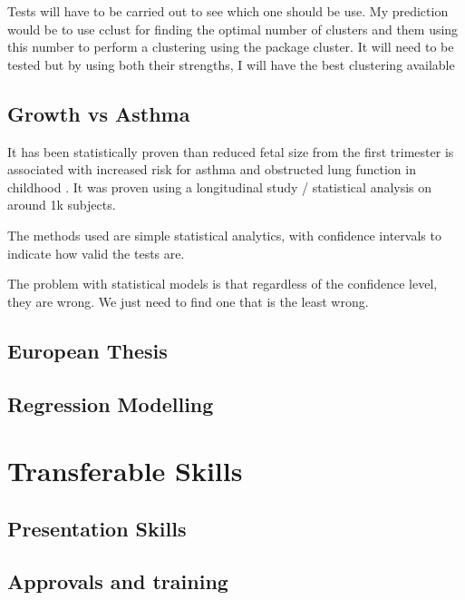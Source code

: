 \documentclass[bsc]{abdnthesis}
\begin{document}
Tests will have to be carried out to see which one should be use. My prediction would be to use cclust for finding the optimal number of clusters and them using this number to perform a clustering using the package cluster. It will need to be tested but by using both their strengths, I will have the best clustering available
\section{Growth vs Asthma} %
\label{sec:growth_vs_asthma}
It has been statistically proven than reduced fetal size from the first trimester is associated with increased risk for asthma and obstructed lung function in childhood \cite{ turner1}. It was proven using a longitudinal study / statistical analysis on around 1k subjects. 

The methods used are simple statistical analytics, with confidence intervals to indicate how valid the tests are. 

The problem with statistical models is that regardless of the confidence level, they are wrong. We just need to find one that is the least wrong. 
\section{European Thesis} %
\label{sec:european_thesis}

\section{Regression Modelling} %
\label{sec:regression_modelling}



\chapter{Transferable Skills}
\section{Presentation Skills} %
\label{sec:presentation_skills}

\section{Approvals and training} %
\label{sec:approvals_and_training}
\end{document}
